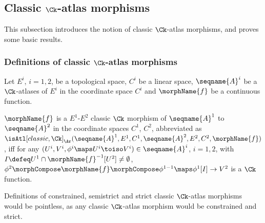 \documentclass{article}
\begin{document}
\subsection{Classic \ensuremath{\Ck}-atlas morphisms}
\label{sub:Ck-ATLcmorph}
This subsection introduces the notion of classic $\Ck$-atlas morphisms,
and proves some basic results.

\subsubsection{Definitions of classic \ensuremath{\Ck}-atlas morphisms}
\begin{definition}
\label{def:Ck-ATLcmorph}
Let $E^i$, $i=1,2$, be a topological space, $C^i$ be a linear space,
$\seqname{A}^i$ be a $\Ck$-atlases of $E^i$ in the coordinate space
$C^i$ and $\morphName{f}$ be a continuous function.

$\morphName{f}$ is a $E^1$-$E^2$ classic $\Ck$ morphism of
$\seqname{A}^1$ to $\seqname{A}^2$ in the coordinate spaces $C^1$,
$C^2$, abbreviated as
$
\isAtl[classic,\Ck]_\Ar
  (
    \seqname{A}^1,
    E ^1,
    C^1,
    \seqname{A}^2,
    E^2,
    C^2,
    \morphName{f}
  )
$,
iff for any
$(U^i, V^i, \phi^i \maps U^i \toiso V^i) \in \seqname{A}^i$,
$i=1,2$, with $I \defeq U^1 \cap \morphName{f}^{-1}[U^2] \neq \emptyset$,
$
  \phi^2 \morphCompose \morphName{f} \morphCompose \phi^{1-1} \maps
    \phi^1[I] \to V^2
$
is a $\Ck$ function.
\end{definition}

\begin{remark}
Definitions of constrained, semistrict and strict classic $\Ck$-atlas
morphisms would be pointless, as any classic $\Ck$-atlas
morphism would be constrained and strict.
\end{remark}
\end{document}
